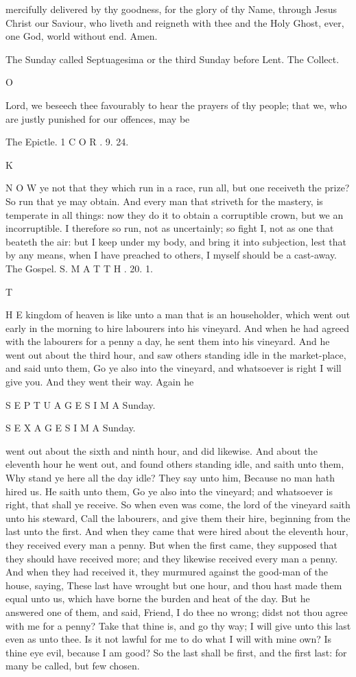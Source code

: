 mercifully delivered by thy goodness, for the glory of thy Name, through Jesus Christ our Saviour, who liveth and reigneth with thee and the Holy Ghost, ever, one God, world without end. Amen.

The Sunday called Septuagesima or the third Sunday before Lent. The Collect.

O

Lord, we beseech thee favourably to hear the prayers of thy people; that we, who are justly punished for our offences, may be

The Epictle. 1 C O R . 9. 24.

K

N O W ye not that they which run in a race, run all, but one receiveth the prize? So run that ye may obtain. And every man that striveth for the mastery, is temperate in all things: now they do it to obtain a corruptible crown, but we an incorruptible. I therefore so run, not as uncertainly; so fight I, not as one that beateth the air: but I keep under my body, and bring it into subjection, lest that by any means, when I have preached to others, I myself should be a cast-away. The Gospel. S. M A T T H . 20. 1.

T

H E kingdom of heaven is like unto a man that is an householder, which went out early in the morning to hire labourers into his vineyard. And when he had agreed with the labourers for a penny a day, he sent them into his vineyard. And he went out about the third hour, and saw others standing idle in the market-place, and said unto them, Go ye also into the vineyard, and whatsoever is right I will give you. And they went their way. Again he

S E P T U A G E S I M A Sunday.

S E X A G E S I M A Sunday.

went out about the sixth and ninth hour, and did likewise. And about the eleventh hour he went out, and found others standing idle, and saith unto them, Why stand ye here all the day idle? They say unto him, Because no man hath hired us. He saith unto them, Go ye also into the vineyard; and whatsoever is right, that shall ye receive. So when even was come, the lord of the vineyard saith unto his steward, Call the labourers, and give them their hire, beginning from the last unto the first. And when they came that were hired about the eleventh hour, they received every man a penny. But when the first came, they supposed that they should have received more; and they likewise received every man a penny. And when they had received it, they murmured against the good-man of the house, saying, These last have wrought but one hour, and thou hast made them equal unto us, which have borne the burden and heat of the day. But he answered one of them, and said, Friend, I do thee no wrong; didst not thou agree with me for a penny? Take that thine is, and go thy way; I will give unto this last even as unto thee. Is it not lawful for me to do what I will with mine own? Is thine eye evil, because I am good? So the last shall be first, and the first last: for many be called, but few chosen.

